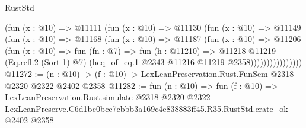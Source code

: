 \begin{lexlean}{RustStd}
\begin{coremodule}
                    (fun (x : @10) =>
                    @11111
                      (fun (x : @10) =>
                      @11130
                        (fun (x : @10) =>
                        @11149
                          (fun (x : @10) =>
                          @11168
                            (fun (x : @10) =>
                            @11187
                              (fun (x : @10) =>
                              @11206
                                (fun (x : @10) =>
                                fun (fn : @7) =>
                                fun (h : @11210) =>
                                @11218
                                  @11219
                                  (Eq.refl.{2} (Sort 1) @7)
                                  (heq_of_eq.{1} @2343 @11216 @11219 @2358))))))))))))))))
@11272 := (n : @10) -> (f : @10) -> LexLeanPreservation.Rust.FunSem @2318 @2320 @2322 @2402 @2358
@11282 := fun (n : @10) =>
  fun (f : @10) =>
  LexLeanPreservation.Rust.simulate
    @2318
    @2320
    @2322
    LexLeanPreserve.C6d1bc0bcc7cbbb3a169c4e838883ff45.R35.RustStd.crate_ok
    @2402
    @2358
\end{coremodule}
\end{lexlean}
